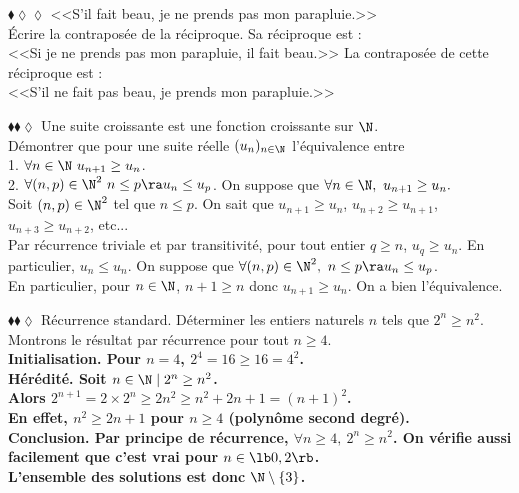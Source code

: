 \documentclass[11pt]{article}
\begin{document}
\vspace*{-0.8cm}

\begin{exercice}{$\blacklozenge\lozenge\lozenge$}{}
    <<S'il fait beau, je ne prends pas mon parapluie.>>\\
    Écrire la contraposée de la réciproque.
    \tcblower
    Sa réciproque est :\\
    <<Si je ne prends pas mon parapluie, il fait beau.>>\n
    La contraposée de cette réciproque est :\\
    <<S'il ne fait pas beau, je prends mon parapluie.>>
\end{exercice}

\vspace*{-0.8cm}

\begin{exercice}{$\blacklozenge\blacklozenge\lozenge$}{}
    Une suite croissante est une fonction croissante sur $\N$.\\
    Démontrer que pour une suite réelle $(u_n)_{n\in\N}$ l'équivalence entre\\
    1. $\forall n \in \N ~ u_{n+1} \geq u_n$.\\
    2. $\forall (n,p) \in \N^2 ~ n \leq p \ra u_n \leq u_p$.
    \tcblower
    \fbox{$\ra$} On suppose que $\forall n \in \N, ~ u_{n+1} \geq u_n.$\\
    Soit $(n,p) \in \N^2$ tel que $n \leq p$. On sait que $u_{n+1} \geq u_n$, $u_{n+2} \geq u_{n+1}$, $u_{n+3} \geq u_{n+2}$, etc...\\
    Par récurrence triviale et par transitivité, pour tout entier $q\geq n$, $u_q \geq u_n$. En particulier, $u_n \leq u_n$.\n
    \fbox{$\la$} On suppose que $\forall (n,p) \in \N^2, ~ n \leq p \ra u_n \leq u_p$.\\
    En particulier, pour $n\in \N$, $n+1 \geq n$ donc $u_{n+1} \geq u_n$.\n
    On a bien l'équivalence. 
\end{exercice}

\vspace*{-0.8cm}

\begin{exercice}{$\blacklozenge\blacklozenge\lozenge$ Récurrence standard.}{}
    Déterminer les entiers naturels $n$ tels que $2^n\geq n^2$.
    \tcblower
    Montrons le résultat par récurrence pour tout $n\geq4$.\\
    \bf{Initialisation.} Pour $n=4$, $2^4=16\geq16=4^2$.\\
    \bf{Hérédité.} Soit $n\in\N \mid 2^n\geq n^2$.\\
    Alors $2^{n+1}=2\times2^n\geq2n^2\geq n^2 + 2n + 1 = (n+1)^2$.\\
    En effet, $n^2\geq2n+1$ pour $n\geq4$ (polynôme second degré).\\
    \bf{Conclusion.} Par principe de récurrence, $\forall n\geq4,~ 2^n\geq n^2$.\n
    On vérifie aussi facilement que c'est vrai pour $n\in\lb0,2\rb$.\\
    L'ensemble des solutions est donc $\N\setminus\{3\}$.
\end{exercice}
\end{document}

